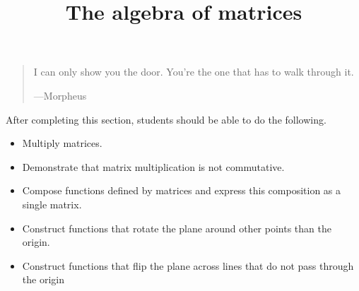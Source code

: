 \documentclass{ximera}
\title{The algebra of matrices}
\begin{document}
\begin{abstract}
\end{abstract}
\maketitle

\begin{quote}
  I can only show you the door. You're the one that has to walk through it.


  \hfill ---Morpheus
\end{quote}
After completing this section, students should be able to do the following.

\begin{itemize}
\item Multiply matrices.
\item Demonstrate that matrix multiplication is not commutative.
\item Compose functions defined by matrices and express this
  composition as a single matrix.
\item Construct functions that rotate the plane around other points
  than the origin.
\item Construct functions that flip the plane across lines that do not
  pass through the origin
\end{itemize}
\end{document}
